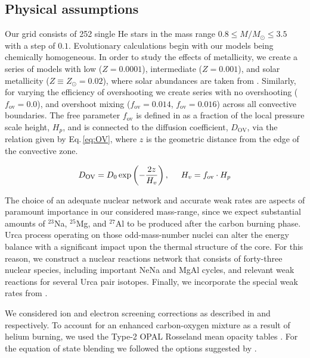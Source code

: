 \documentclass[../../main/thesis_msc.tex]{subfiles}
\begin{document}
\subsection{Physical assumptions} \label{sec:input_physics}
Our grid consists of 252 single He stars in the mass range $0.8 \leq M/M_{\odot} \leq 3.5$ with a step of $0.1$. Evolutionary calculations begin with our models being chemically homogeneous. In order to study the effects of metallicity, we create a series of models with low ($Z=0.0001$), intermediate ($Z=0.001$), and solar metallicity ($Z \equiv Z_{\odot} = 0.02$), where solar abundances are taken from \cite{grevesse1998}. Similarly, for varying the efficiency of overshooting we create series with no overshooting ($f_{\text{ov}} = 0.0$), and overshoot mixing ($f_{\text{ov}} = 0.014$, $f_{\text{ov}} = 0.016$) across all convective boundaries. The free parameter $f_{\text{ov}}$ is defined in \cite{Herwig2000} as a fraction of the local pressure scale height, $H_p$, and is connected to the diffusion coefficient, $D_{\text{OV}}$, via the relation given by Eq.\,\ref{eq:OV}, where $z$ is the geometric distance from the edge of the convective zone.
    					
    \begin{align}
    	\label{eq:OV}
    	D_{\text{OV}} = D_0 \exp \left( - \frac{2z}{H_v} \right), \hspace{0.5cm} H_v = f_{\text{ov}} \cdot H_p
    \end{align}

The choice of an adequate nuclear network and accurate weak rates are aspects of paramount importance in our considered mass-range, since we expect substantial amounts of $^{23}$Na, $^{25}$Mg, and $^{27}$Al to be produced after the carbon burning phase. Urca process operating on those odd-mass-number nuclei can alter the energy balance with a significant impact upon the thermal structure of the core. For this reason, we construct a nuclear reactions network that consists of forty-three nuclear species, including important NeNa and MgAl cycles, and relevant weak reactions for several Urca pair isotopes. Finally, we incorporate the special weak rates from \cite{Suzuki:2015iry}.

We considered ion and electron screening corrections as described in \cite{PCR2009} and \cite{Itoh2002} respectively. To account for an enhanced carbon-oxygen mixture as a result of helium burning, we used the Type-2 OPAL Rosseland mean opacity tables \citep{OPAL}. For the equation of state blending we followed the options suggested by \cite{Schwab:2017epw}.
\end{document}
